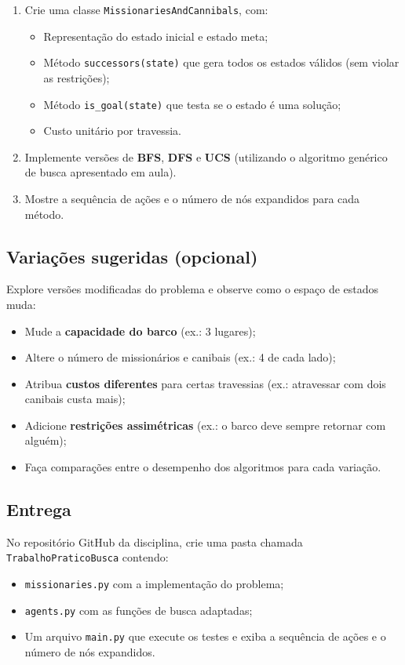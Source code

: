 \documentclass[9pt,a4paper]{extarticle}
\begin{document}
\begin{enumerate}
  \item Crie uma classe \texttt{MissionariesAndCannibals}, com:
  \begin{itemize}
    \item Representação do estado inicial e estado meta;
    \item Método \texttt{successors(state)} que gera todos os estados válidos (sem violar as restrições);
    \item Método \texttt{is\_goal(state)} que testa se o estado é uma solução;
    \item Custo unitário por travessia.
  \end{itemize}
  
  \item Implemente versões de \textbf{BFS}, \textbf{DFS} e \textbf{UCS} (utilizando o algoritmo genérico de busca apresentado em aula).
  
  \item Mostre a sequência de ações e o número de nós expandidos para cada método.
\end{enumerate}

\subsection*{Variações sugeridas (opcional)}

Explore versões modificadas do problema e observe como o espaço de estados muda:
\begin{itemize}
  \item Mude a \textbf{capacidade do barco} (ex.: 3 lugares);
  \item Altere o número de missionários e canibais (ex.: 4 de cada lado);
  \item Atribua \textbf{custos diferentes} para certas travessias (ex.: atravessar com dois canibais custa mais);
  \item Adicione \textbf{restrições assimétricas} (ex.: o barco deve sempre retornar com alguém);
  \item Faça comparações entre o desempenho dos algoritmos para cada variação.
\end{itemize}

\subsection*{Entrega}

No repositório GitHub da disciplina, crie uma pasta chamada \texttt{TrabalhoPraticoBusca} contendo:
\begin{itemize}
  \item \texttt{missionaries.py} com a implementação do problema;
  \item \texttt{agents.py} com as funções de busca adaptadas;
  \item Um arquivo \texttt{main.py} que execute os testes e exiba a sequência de ações e o número de nós expandidos.
\end{itemize}
\end{document}
